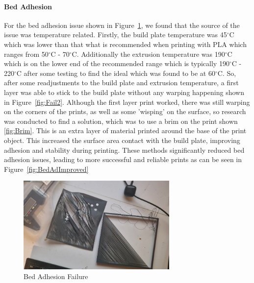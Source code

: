 \paragraph{Bed Adhesion}

For the bed adhesion issue shown in Figure~\ref{fig:Fail1}, we found that the source of the issue was temperature related. 
Firstly, the build plate temperature was 45$^{\circ}$C which was lower than that what is recommended when printing with PLA which ranges from 50$^{\circ}$C - 70$^{\circ}$C. 
Additionally the extrusion temperature was 190$^{\circ}$C which is on the lower end of the recommended range which is typically 190$^{\circ}$C - 220$^{\circ}$C \cite{RefWorks:RefID:91-unionfab2025ultimate} after some testing to find the ideal which was found to be at 60$^{\circ}$C.
So, after some readjustments to the build plate and extrusion temperature, a first layer was able to stick to the build plate without any warping happening shown in Figure~\ref{fig:Fail2}.
Although the first layer print worked, there was still warping on the corners of the prints, as well as some 'wisping' on the surface, so research was conducted to find a solution, which was to use a brim on the print shown \ref{fig:Brim}.
This is an extra layer of material printed around the base of the print object. 
This increased the surface area contact with the build plate, improving adhesion and stability during printing. 
These methods significantly reduced bed adhesion issues, leading to more successful and reliable prints as can be seen in Figure~\ref{fig:BedAdImproved}

\begin{figure}[htbp]
    \centering
    \includegraphics[width=0.7\textwidth]{figures/CAD-3DPrint/FAIL1.jpg}
    \caption{Bed Adhesion Failure}
    \label{fig:Fail1}
   
    
\end{figure}

